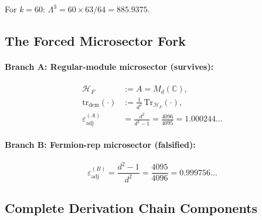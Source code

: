 \documentclass[11pt]{article}
\begin{document}
For $k = 60$: $\Lambda^3 = 60 \times 63/64 = 885.9375$.

\subsection{The Forced Microsector Fork}

\paragraph{Branch A: Regular-module microsector (survives):}
\begin{align}
\mathcal{H}_F &:= A = M_d(\mathbb{C}), \tag{Fork-A1} \\
\mathrm{tr}_{\mathrm{dem}}(\cdot) &:= \frac{1}{d^2}\,\mathrm{Tr}_{\mathcal{H}_F}(\cdot), \tag{Fork-A2} \\
\varepsilon_{\mathrm{adj}}^{(A)} &= \frac{d^2}{d^2 - 1} = \frac{4096}{4095} = 1.000244\ldots \tag{Fork-A3}
\end{align}

\paragraph{Branch B: Fermion-rep microsector (falsified):}
\begin{equation}\tag{Fork-B1}
\varepsilon_{\mathrm{adj}}^{(B)} = \frac{d^2 - 1}{d^2} = \frac{4095}{4096} = 0.999756\ldots
\end{equation}

\subsection{Complete Derivation Chain Components}
\end{document}
